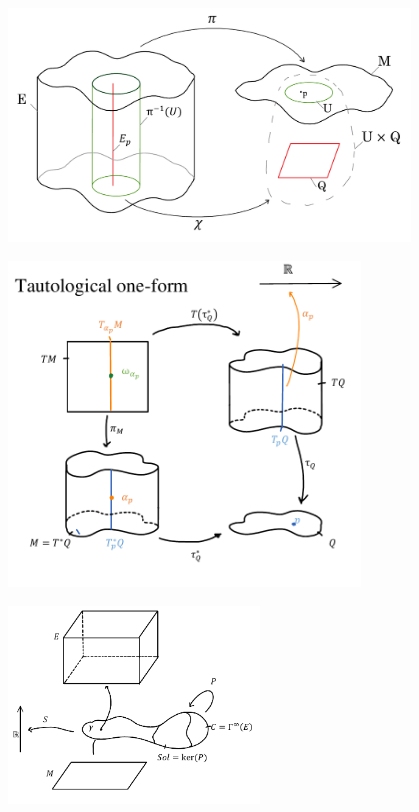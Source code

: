\documentclass{article}
\begin{document}
	\includegraphics[width=0.8\textwidth]{../Pictures/fiberbundle}		
 
 	\includegraphics[width=0.7\textwidth]{../Pictures/Tautological1Form} 

	\includegraphics[width=0.5\textwidth]{../Pictures/AbstractFieldTheory} 
\end{document}
